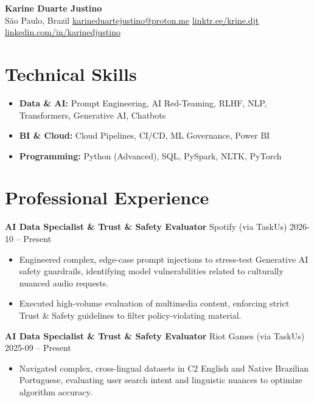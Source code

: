 ﻿\documentclass[11pt,a4paper]{article}
\begin{document}
\begin{center}
    {\Huge \textbf{Karine Duarte Justino}} \\ \vspace{6pt}
    São Paulo, Brazil \textbar{} \href{mailto:karineduartejustino@proton.me}{karineduartejustino@proton.me} \textbar{} \href{https://linktr.ee/krine.djt}{linktr.ee/krine.djt} \textbar{} \href{https://linkedin.com/in/karinedjustino}{linkedin.com/in/karinedjustino}
\end{center}

\section*{Technical Skills}
\begin{itemize}[leftmargin=0.15in, label={}, itemsep=2pt, parsep=0pt, topsep=0pt]
    \item \textbf{Data \& AI:} Prompt Engineering, AI Red-Teaming, RLHF, NLP, Transformers, Generative AI, Chatbots
    \item \textbf{BI \& Cloud:} Cloud Pipelines, CI/CD, ML Governance, Power BI
    \item \textbf{Programming:} Python (Advanced), SQL, PySpark, NLTK, PyTorch
\end{itemize}

\section*{Professional Experience}
\noindent \textbf{AI Data Specialist \& Trust \& Safety Evaluator} \textbar{} Spotify (via TaskUs) \hfill 2026-10 -- Present \par
\begin{itemize}[noitemsep,topsep=2pt,parsep=2pt,partopsep=0pt, leftmargin=*]
    \item Engineered complex, edge-case prompt injections to stress-test Generative AI safety guardrails, identifying model vulnerabilities related to culturally nuanced audio requests.
    \item Executed high-volume evaluation of multimedia content, enforcing strict Trust \& Safety guidelines to filter policy-violating material.
\end{itemize}
\vspace{6pt}

\noindent \textbf{AI Data Specialist \& Trust \& Safety Evaluator} \textbar{} Riot Games (via TaskUs) \hfill 2025-09 -- Present \par
\begin{itemize}[noitemsep,topsep=2pt,parsep=2pt,partopsep=0pt, leftmargin=*]
    \item Navigated complex, cross-lingual datasets in C2 English and Native Brazilian Portuguese, evaluating user search intent and linguistic nuances to optimize algorithm accuracy.
\end{itemize}
\vspace{6pt}
\end{document}
